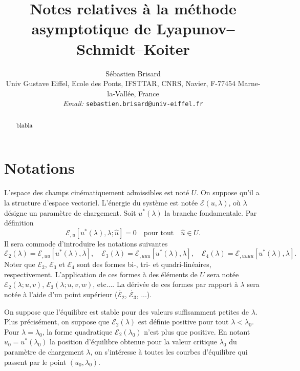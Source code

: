 \documentclass{article}
\newcommand{\tmaffiliation}[1]{\\ #1}
\newcommand{\tmemail}[1]{\\ \textit{Email:} \texttt{#1}}
\begin{document}
\title{Notes relatives {\`a} la m{\'e}thode asymptotique de
Lyapunov--Schmidt--Koiter}

\author{
  S{\'e}bastien Brisard
  \tmaffiliation{Univ Gustave Eiffel, Ecole des Ponts, IFSTTAR, CNRS, Navier,
  F-77454 Marne-la-Vall{\'e}e, France}
  \tmemail{sebastien.brisard@univ-eiffel.fr}
}

\maketitle

\begin{abstract}
  blabla
\end{abstract}

\section{Notations}

L'espace des champs cin{\'e}matiquement admissibles est not{\'e} $U$. On
suppose qu'il a la structure d'espace vectoriel. L'{\'e}nergie du syst{\`e}me
est not{\'e}e $\mathcal{E} (u, \lambda)$, o{\`u} $\lambda$ d{\'e}signe un
param{\`e}tre de chargement. Soit $u^{\ast} (\lambda)$ la branche
fondamentale. Par d{\'e}finition
\begin{equation}
  \mathcal{E}_{, u} [u^{\ast} (\lambda), \lambda ; \hat{u}] = 0 \quad
  \text{pour tout} \quad \hat{u} \in U.
\end{equation}
Il sera commode d'introduire les notations suivantes
\begin{equation}
  \mathcal{E}_2 (\lambda) =\mathcal{E}_{, u  u}  [u^{\ast} (\lambda),
  \lambda], \quad \mathcal{E}_3 (\lambda) =\mathcal{E}_{, u  u
   u} [u^{\ast} (\lambda), \lambda], \quad \mathcal{E}_4 (\lambda)
  =\mathcal{E}_{, u  u  u  u} [u^{\ast} (\lambda),
  \lambda] .
\end{equation}
Noter que $\mathcal{E}_2$, $\mathcal{E}_3$ et $\mathcal{E}_4$ sont des formes
bi-, tri- et quadri-lin{\'e}aires, respectivement. L'application de ces formes
{\`a} des {\'e}l{\'e}ments de $U$ sera not{\'e}e $\mathcal{E}_2 (\lambda ; u,
v)$, $\mathcal{E}_3 (\lambda ; u, v, w)$, etc.... La d{\'e}riv{\'e}e de ces
formes par rapport {\`a} $\lambda$ sera not{\'e}e {\`a} l'aide d'un point
sup{\'e}rieur ($\dot{\mathcal{E}_2}$, $\dot{\mathcal{E}_3}$, ...).

On suppose que l'{\'e}quilibre est stable pour des valeurs suffisamment
petites de $\lambda$. Plus pr{\'e}cis{\'e}ment, on suppose que $\mathcal{E}_2
(\lambda)$ est d{\'e}finie positive pour tout $\lambda < \lambda_0$. Pour
$\lambda = \lambda_0$, la forme quadratique $\mathcal{E}_2 (\lambda_0)$ n'est
plus que positive. En notant $u_0 = u^{\ast} (\lambda_0)$ la position
d'{\'e}quilibre obtenue pour la valeur critique $\lambda_0$ du param{\`e}tre
de chargement $\lambda$, on s'int{\'e}resse {\`a} toutes les courbes
d'{\'e}quilibre qui passent par le point $(u_0, \lambda_0)$.
\end{document}
